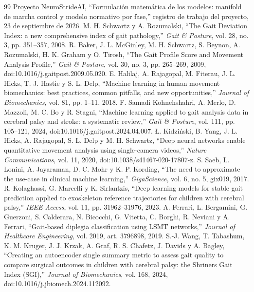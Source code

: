 \documentclass[11pt,a4paper]{article}
\begin{document}
\begin{thebibliography}{99}
\small
{} Proyecto NeuroStrideAI, ``Formulación matemática de los modelos: manifold de marcha control y modelo normativo por fase,'' registro de trabajo del proyecto, 23 de septiembre de 2026.
 M. H. Schwartz y A. Rozumalski, ``The Gait Deviation Index: a new comprehensive index of gait pathology,'' \emph{Gait \& Posture}, vol. 28, no. 3, pp. 351--357, 2008.
 R. Baker, J. L. McGinley, M. H. Schwartz, S. Beynon, A. Rozumalski, H. K. Graham y O. Tirosh, ``The Gait Profile Score and Movement Analysis Profile,'' \emph{Gait \& Posture}, vol. 30, no. 3, pp. 265--269, 2009, doi:10.1016/j.gaitpost.2009.05.020.
 E. Halilaj, A. Rajagopal, M. Fiterau, J. L. Hicks, T. J. Hastie y S. L. Delp, ``Machine learning in human movement biomechanics: best practices, common pitfalls, and new opportunities,'' \emph{Journal of Biomechanics}, vol. 81, pp. 1--11, 2018.
 F. Samadi Kohnehshahri, A. Merlo, D. Mazzoli, M. C. Bo y R. Stagni, ``Machine learning applied to gait analysis data in cerebral palsy and stroke: a systematic review,'' \emph{Gait \& Posture}, vol. 111, pp. 105--121, 2024, doi:10.1016/j.gaitpost.2024.04.007.
 \L. Kidzi\'nski, B. Yang, J. L. Hicks, A. Rajagopal, S. L. Delp y M. H. Schwartz, ``Deep neural networks enable quantitative movement analysis using single-camera videos,'' \emph{Nature Communications}, vol. 11, 2020, doi:10.1038/s41467-020-17807-z.
 S. Saeb, L. Lonini, A. Jayaraman, D. C. Mohr y K. P. Kording, ``The need to approximate the use-case in clinical machine learning,'' \emph{GigaScience}, vol. 6, no. 5, gix019, 2017.
 R. Kolaghassi, G. Marcelli y K. Sirlantzis, ``Deep learning models for stable gait prediction applied to exoskeleton reference trajectories for children with cerebral palsy,'' \emph{IEEE Access}, vol. 11, pp. 31962--31976, 2023.
 A. Ferrari, L. Bergamini, G. Guerzoni, S. Calderara, N. Bicocchi, G. Vitetta, C. Borghi, R. Neviani y A. Ferrari, ``Gait-based diplegia classification using LSMT networks,'' \emph{Journal of Healthcare Engineering}, vol. 2019, art. 3796898, 2019.
 S.-J. Wang, T. Tabashum, K. M. Kruger, J. J. Krzak, A. Graf, R. S. Chafetz, J. Davids y A. Bagley, ``Creating an autoencoder single summary metric to assess gait quality to compare surgical outcomes in children with cerebral palsy: the Shriners Gait Index (SGI),'' \emph{Journal of Biomechanics}, vol. 168, 2024, doi:10.1016/j.jbiomech.2024.112092.

\end{thebibliography}
\end{document}

